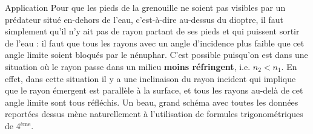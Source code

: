 \documentclass[../main/main.tex]{subfiles}
\begin{document}
\begin{NCexem}[breakable]{Application}
    Pour que les pieds de la grenouille ne soient pas visibles par un prédateur
    situé en-dehors de l'eau, c'est-à-dire au-dessus du dioptre, il faut
    simplement qu'il n'y ait pas de rayon partant de ses pieds et qui puissent
    sortir de l'eau : il faut que tous les rayons avec un angle d'incidence plus
    faible que cet angle limite soient bloqués par le nénuphar. C'est possible
    puisqu'on est dans une situation où le rayon passe dans un milieu
    \textbf{moins réfringent}, i.e. $n_2 < n_1$. En effet, dans cette situation
    il y a une inclinaison du rayon incident qui implique que le rayon émergent
    est parallèle à la surface, et tous les rayons au-delà de cet angle limite
    sont tous réfléchis. Un beau, grand schéma avec toutes les données reportées
    dessus mène naturellement à l'utilisation de formules trigonométriques de
    4$^\text{ème}$.
    \begin{center}
        \vspace*{-2.5cm}
\end{center}
\end{NCexem}
\end{document}

